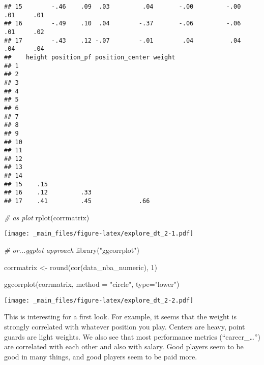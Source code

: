 \documentclass[
]{book}
\newenvironment{Shaded}{\begin{snugshade}}{\end{snugshade}}
\newcommand{\AttributeTok}[1]{\textcolor[rgb]{0.77,0.63,0.00}{#1}}
\newcommand{\AttributeTok}[1]{\textcolor[rgb]{0.13,0.29,0.53}{#1}}
\newcommand{\CommentTok}[1]{\textcolor[rgb]{0.56,0.35,0.01}{\textit{#1}}}
\newcommand{\DecValTok}[1]{\textcolor[rgb]{0.00,0.00,0.81}{#1}}
\newcommand{\FunctionTok}[1]{\textcolor[rgb]{0.00,0.00,0.00}{#1}}
\newcommand{\FunctionTok}[1]{\textcolor[rgb]{0.13,0.29,0.53}{\textbf{#1}}}
\newcommand{\NormalTok}[1]{#1}
\newcommand{\OtherTok}[1]{\textcolor[rgb]{0.56,0.35,0.01}{#1}}
\newcommand{\StringTok}[1]{\textcolor[rgb]{0.31,0.60,0.02}{#1}}
\begin{document}
\begin{verbatim}
## 15        -.46    .09  .03         .04       -.00         -.00     .01     .01
## 16        -.49    .10  .04        -.37       -.06         -.06     .01     .02
## 17        -.43    .12 -.07        -.01        .04          .04     .04     .04
##    height position_pf position_center weight
## 1                                           
## 2                                           
## 3                                           
## 4                                           
## 5                                           
## 6                                           
## 7                                           
## 8                                           
## 9                                           
## 10                                          
## 11                                          
## 12                                          
## 13                                          
## 14                                          
## 15    .15                                   
## 16    .12         .33                       
## 17    .41         .45             .66
\end{verbatim}

\begin{Shaded}
\begin{Highlighting}[]
\CommentTok{\# as plot}
\FunctionTok{rplot}\NormalTok{(corrmatrix)}
\end{Highlighting}
\end{Shaded}

\texttt{[image: \_main\_files/figure-latex/explore\_dt\_2-1.pdf]}

\begin{Shaded}
\begin{Highlighting}[]
\CommentTok{\# or...ggplot approach}
\FunctionTok{library}\NormalTok{(}\StringTok{"ggcorrplot"}\NormalTok{)}

\NormalTok{corrmatrix }\OtherTok{\textless{}{-}} \FunctionTok{round}\NormalTok{(}\FunctionTok{cor}\NormalTok{(data\_nba\_numeric), }\DecValTok{1}\NormalTok{)}

\FunctionTok{ggcorrplot}\NormalTok{(corrmatrix,}
           \AttributeTok{method =} \StringTok{"circle"}\NormalTok{,}
           \AttributeTok{type=}\StringTok{"lower"}\NormalTok{)}
\end{Highlighting}
\end{Shaded}

\texttt{[image: \_main\_files/figure-latex/explore\_dt\_2-2.pdf]}

This is interesting for a first look. For example, it seems that the weight is
strongly correlated with whatever position you play. Centers are heavy, point
guards are light weights.
We also see that most performance metrics (``career\_\ldots{}'') are correlated with each
other and also with salary. Good players seem to be good in many things, and
good players seem to be paid more.
\end{document}
